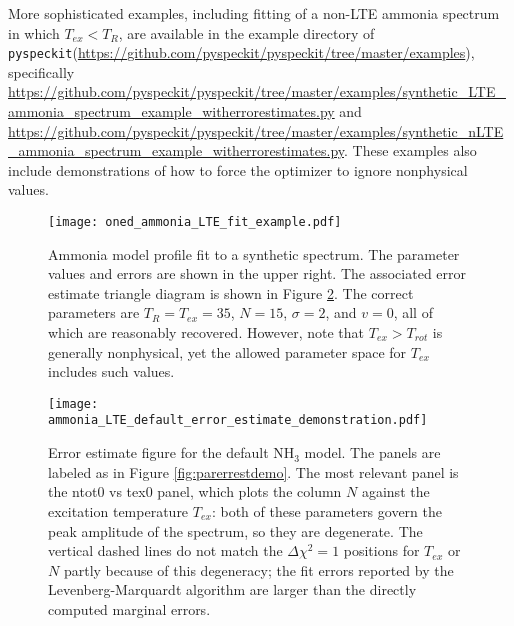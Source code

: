 \documentclass[twocolumn]{aastex62}
\newcommand{\pyspeckit}{\texttt{pyspeckit}\xspace}
\newcommand{\ammonia}{\ensuremath{\mathrm{NH}_3}\xspace}
\begin{document}
More sophisticated examples, including fitting of a non-LTE ammonia spectrum
in which $T_{ex} < T_{R}$, are available in the example directory
of \pyspeckit (\url{https://github.com/pyspeckit/pyspeckit/tree/master/examples}),
specifically
\url{https://github.com/pyspeckit/pyspeckit/tree/master/examples/synthetic_LTE_ammonia_spectrum_example_witherrorestimates.py}
and
\url{https://github.com/pyspeckit/pyspeckit/tree/master/examples/synthetic_nLTE_ammonia_spectrum_example_witherrorestimates.py}.
These examples also include demonstrations of how to force the optimizer to
ignore nonphysical values.


\begin{figure*}[!htp]
\texttt{[image: oned\_ammonia\_LTE\_fit\_example.pdf]}
\caption{Ammonia model profile fit to a synthetic spectrum.
The parameter values and errors are shown in the upper right.  The associated
error estimate triangle diagram is shown in Figure \ref{fig:nh3parerrestdemo}.
The correct parameters are $T_{R}=T_{ex}=35$, $N=15$, $\sigma=2$, and $v=0$,
all of which are reasonably recovered.  However, note that $T_{ex} > T_{rot}$
is generally nonphysical, yet the allowed parameter space for $T_{ex}$ includes
such values.
}
\label{fig:nh3synthspecdemo}
\end{figure*}


\begin{figure*}[!htp]
\texttt{[image: ammonia\_LTE\_default\_error\_estimate\_demonstration.pdf]}
\caption{Error estimate figure for the default \ammonia model.  The panels
are labeled as in Figure \ref{fig:parerrestdemo}.  The most
relevant panel is the ntot0 vs tex0 panel, which plots the column $N$ against
the excitation temperature $T_{ex}$: both of these parameters govern the peak
amplitude of the spectrum, so they are degenerate.  The vertical dashed lines
do not match the $\Delta\chi^2=1$ positions for $T_{ex}$ or $N$ partly because
of this degeneracy; the fit errors reported by the Levenberg-Marquardt
algorithm are larger than the directly computed marginal errors.}
\label{fig:nh3parerrestdemo}
\end{figure*}
\end{document}
